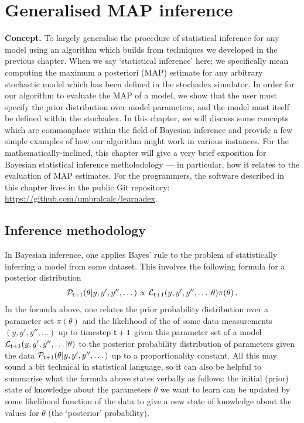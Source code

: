 \chapter{\sffamily Generalised MAP inference}

{\bfseries\sffamily Concept.} To largely generalise the procedure of statistical inference for any model using an algorithm which builds from techniques we developed in the previous chapter. When we say `statistical inference' here; we specifically mean computing the maximum a posteriori (MAP) estimate for any arbitrary stochastic model which has been defined in the stochadex simulator. In order for our algorithm to evaluate the MAP of a model, we show that the user must specify the prior distribution over model parameters, and the model must itself be defined within the stochadex. In this chapter, we will discuss some concepts which are commonplace within the field of Bayesian inference and provide a few simple examples of how our algorithm might work in various instances. For the mathematically-inclined, this chapter will give a very brief exposition for Bayesian statistical inference metholodology --- in particular, how it relates to the evaluation of MAP estimates. For the programmers, the software described in this chapter lives in the public Git repository: \href{https://github.com/umbralcalc/learnadex}{https://github.com/umbralcalc/learnadex}.


\section{\sffamily Inference methodology}

In Bayesian inference, one applies Bayes' rule to the problem of statistically inferring a model from some dataset. This involves the following formula for a posterior distribution
\begin{align}
{\cal P}_{{\sf t}+1}(\theta \vert y, y', y'', \dots) \propto {\cal L}_{{\sf t}+1}(y, y', y'', \dots\vert \theta )\pi (\theta ) \label{eq:bayes-rule} \,.
\end{align}
In the formula above, one relates the prior probability distribution over a parameter set $\pi (\theta )$ and the likelihood of the of some data measurements $(y, y', y'', \dots)$  up to timestep ${\sf t}+1$ given this parameter set of a model ${\cal L}_{{\sf t}+1}(y, y', y'', \dots \vert \theta )$ to the posterior probability distribution of parameters given the data ${\cal P}_{{\sf t}+1}(\theta \vert y, y', y'', \dots)$ up to a proportionality constant. All this may sound a bit technical in statistical language, so it can also be helpful to summarise what the formula above states verbally as follows: the initial (prior) state of knowledge about the parameters $\theta$ we want to learn can be updated by some likelihood function of the data to give a new state of knowledge about the values for $\theta$ (the `posterior' probability). 

